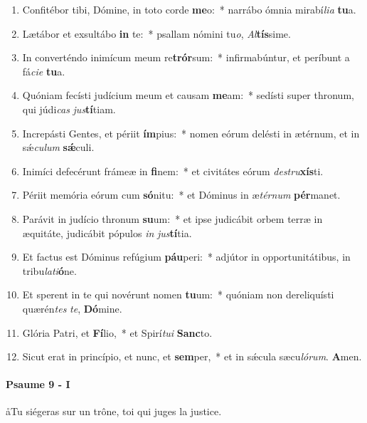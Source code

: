 \documentclass[twoside]{article}
\begin{document}
\begin{paracol}[1]{2}
\begin{enumerate}[wide, itemsep=0mm, labelwidth=!, labelindent=0pt, label=\color{gregoriocolor}\theenumi]
\item Confitébor tibi, Dómine, in toto corde \textbf{me}o:~* narrábo ómnia mirabí\textit{li}\textit{a} \textbf{tu}a.
\item Lætábor et exsultábo \textbf{in} te:~* psallam nómini tu\textit{o}, \textit{Al}\textbf{tís}sime.
\item In converténdo inimícum meum re\textbf{trór}sum:~* infirmabúntur, et períbunt a fá\textit{ci}\textit{e} \textbf{tu}a.
\item Quóniam fecísti judícium meum et causam \textbf{me}am:~* sedísti super thronum, qui júdi\textit{cas} \textit{jus}\textbf{tí}tiam.
\item Increpásti Gentes, et périit \textbf{ím}pius:~* nomen eórum delésti in ætérnum, et in sǽ\textit{cu}\textit{lum} \textbf{sǽ}culi.
\item Inimíci defecérunt frámeæ in \textbf{fi}nem:~* et civitátes eórum \textit{de}\textit{stru}\textbf{xís}ti.
\item Périit memória eórum cum \textbf{só}nitu:~* et Dóminus in æ\textit{tér}\textit{num} \textbf{pér}manet.
\item Parávit in judício thronum \textbf{su}um:~* et ipse judicábit orbem terræ in æquitáte, judicábit pópulos \textit{in} \textit{jus}\textbf{tí}tia.
\item Et factus est Dóminus refúgium \textbf{páu}peri:~* adjútor in opportunitátibus, in tribu\textit{la}\textit{ti}\textbf{ó}ne.
\item Et sperent in te qui novérunt nomen \textbf{tu}um:~* quóniam non dereliquísti quærén\textit{tes} \textit{te}, \textbf{Dó}mine.
\item Glória Patri, et \textbf{Fí}lio,~* et Spirí\textit{tu}\textit{i} \textbf{Sanc}to.
\item Sicut erat in princípio, et nunc, et \textbf{sem}per,~* et in sǽcula sæcu\textit{ló}\textit{rum}. \textbf{A}men.
\end{enumerate}

\switchcolumn

\paragraph{Psaume 9 - I}
\aa Tu siégeras sur un trône, toi qui juges la justice.



\end{paracol}
\end{document}
